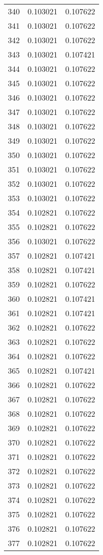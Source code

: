 \begin{longtable}{rrr}
340 & 0.103021 & 0.107622 \\
341 & 0.103021 & 0.107622 \\
342 & 0.103021 & 0.107622 \\
343 & 0.103021 & 0.107421 \\
344 & 0.103021 & 0.107622 \\
345 & 0.103021 & 0.107622 \\
346 & 0.103021 & 0.107622 \\
347 & 0.103021 & 0.107622 \\
348 & 0.103021 & 0.107622 \\
349 & 0.103021 & 0.107622 \\
350 & 0.103021 & 0.107622 \\
351 & 0.103021 & 0.107622 \\
352 & 0.103021 & 0.107622 \\
353 & 0.103021 & 0.107622 \\
354 & 0.102821 & 0.107622 \\
355 & 0.102821 & 0.107622 \\
356 & 0.103021 & 0.107622 \\
357 & 0.102821 & 0.107421 \\
358 & 0.102821 & 0.107421 \\
359 & 0.102821 & 0.107622 \\
360 & 0.102821 & 0.107421 \\
361 & 0.102821 & 0.107421 \\
362 & 0.102821 & 0.107622 \\
363 & 0.102821 & 0.107622 \\
364 & 0.102821 & 0.107622 \\
365 & 0.102821 & 0.107421 \\
366 & 0.102821 & 0.107622 \\
367 & 0.102821 & 0.107622 \\
368 & 0.102821 & 0.107622 \\
369 & 0.102821 & 0.107622 \\
370 & 0.102821 & 0.107622 \\
371 & 0.102821 & 0.107622 \\
372 & 0.102821 & 0.107622 \\
373 & 0.102821 & 0.107622 \\
374 & 0.102821 & 0.107622 \\
375 & 0.102821 & 0.107622 \\
376 & 0.102821 & 0.107622 \\
377 & 0.102821 & 0.107622 \\

\end{longtable}
